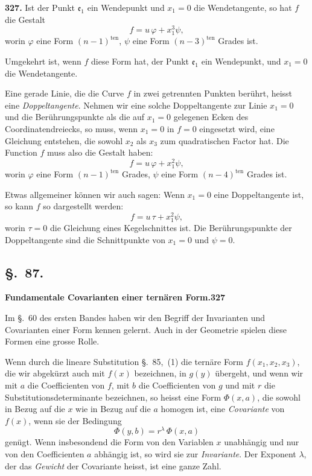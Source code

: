 \documentclass[12pt,a4paper]{article}
\begin{document}
\bigskip
\noindent\textbf{327.} Ist der Punkt $\mathfrak{e}_1$ ein Wendepunkt und $x_1=0$ die Wendetangente, so hat $f$ die Gestalt
\begin{equation}
\tag{4}
f = u\,\varphi + x_1^3\psi,
\end{equation}
worin $\varphi$ eine Form $(n-1)^{\text{ten}}$, $\psi$ eine Form $(n-3)^{\text{ten}}$ Grades ist.

Umgekehrt ist, wenn $f$ diese Form hat, der Punkt $\mathfrak{e}_1$ ein Wendepunkt, und $x_1=0$ die Wendetangente.

Eine gerade Linie, die die Curve $f$ in zwei getrennten Punkten ber\"uhrt, heisst eine \emph{Doppeltangente}. Nehmen wir eine solche Doppeltangente zur Linie $x_1=0$ und die Ber\"uhrungspunkte als die auf $x_1=0$ gelegenen Ecken des Coordinatendreiecks, so muss, wenn $x_1=0$ in $f=0$ eingesetzt wird, eine Gleichung entstehen, die sowohl $x_2$ als $x_3$ zum quadratischen Factor hat. Die Function $f$ muss also die Gestalt haben:
\begin{equation}
\tag{4$'$}
f = u\,\varphi + x_1^2\psi,
\end{equation}
worin $\varphi$ eine Form $(n-1)^{\text{ten}}$ Grades, $\psi$ eine Form $(n-4)^{\text{ten}}$ Grades ist.

Etwas allgemeiner k\"onnen wir auch sagen: Wenn $x_1=0$ eine Doppeltangente ist, so kann $f$ so dargestellt werden:
\begin{equation}
\tag{5}
f = u\,\tau + x_1^2\psi,
\end{equation}
worin $\tau=0$ die Gleichung eines Kegelschnittes ist. Die Ber\"uhrungspunkte der Doppeltangente sind die Schnittpunkte von $x_1=0$ und $\psi=0$.

\subsection*{\S.~87.}
\textbf{Fundamentale Covarianten einer tern\"aren Form.}\hfill\textbf{327}\\[4pt]

Im \S.~60 des ersten Bandes haben wir den Begriff der Invarianten und Covarianten einer Form kennen gelernt. Auch in der Geometrie spielen diese Formen eine grosse Rolle.

Wenn durch die lineare Substitution \S.~85,~(1) die tern\"are Form $f(x_1,x_2,x_3)$, die wir abgek\"urzt auch mit $f(x)$ bezeichnen, in $g(y)$ \"ubergeht, und wenn wir mit $a$ die Coefficienten von $f$, mit $b$ die Coefficienten von $g$ und mit $r$ die Substitutionsdeterminante bezeichnen, so heisst eine Form $\Phi(x,a)$, die sowohl in Bezug auf die $x$ wie in Bezug auf die $a$ homogen ist, eine \emph{Covariante} von $f(x)$, wenn sie der Bedingung
\[
\Phi(y,b) = r^{\lambda}\,\Phi(x,a)
\]
gen\"ugt. Wenn insbesondend die Form von den Variablen $x$ unabh\"angig und nur von den Coefficienten $a$ abh\"angig ist, so wird sie zur \emph{Invariante}. Der Exponent $\lambda$, der das \emph{Gewicht} der Covariante heisst, ist eine ganze Zahl.
\end{document}
